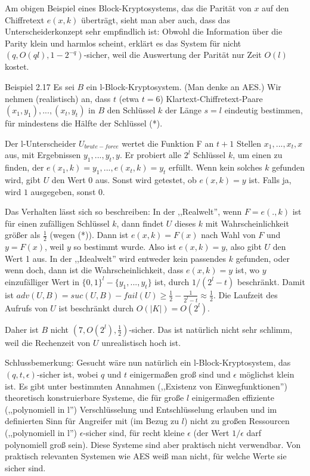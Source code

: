 \documentclass[a4paper]{article}
\begin{document}
\begin{multicols}{3}
    Am obigen Beispiel eines Block-Kryptosystems, das die Parität von $x$ auf den Chiffretext $e(x,k)$ überträgt, sieht man aber auch, dass das Unterscheiderkonzept sehr empfindlich ist: Obwohl die Information über die Parity klein und harmlos scheint, erklärt es das System für nicht $(q,O(ql), 1-2^{-q})$-sicher, weil die Auswertung der Parität nur Zeit $O(l)$ kostet.

    Beispiel 2.17 Es sei $B$ ein l-Block-Kryptosystem. (Man denke an AES.) Wir nehmen (realistisch) an, dass $t$ (etwa $t=6$) Klartext-Chiffretext-Paare $(x_1,y_1),...,(x_t,y_t)$ in $B$ den Schlüssel $k$ der Länge $s=l$ eindeutig bestimmen, für mindestens die Hälfte der Schlüssel (*).

    Der l-Unterscheider $U_{brute-force}$ wertet die Funktion F an $t+1$ Stellen $x_1,...,x_t,x$ aus, mit Ergebnissen $y_1,...,y_t,y$. Er probiert alle $2^l$ Schlüssel $k$, um einen zu finden, der $e(x_1,k)=y_1 ,...,e(x_t,k) =y_t$ erfüllt. Wenn kein solches $k$ gefunden wird, gibt $U$ den Wert $0$ aus.
    Sonst wird getestet, ob $e(x,k)=y$ ist. Falls ja, wird $1$ ausgegeben, sonst $0$.

    Das Verhalten lässt sich so beschreiben: In der ,,Realwelt'', wenn $F=e(.,k)$ ist für einen zufälligen Schlüssel $k$, dann findet $U$  dieses $k$ mit Wahrscheinlichkeit größer als $\frac{1}{2}$ (wegen (*)). Dann ist $e(x,k) =F(x)$ nach Wahl von $F$ und $y=F(x)$, weil $y$ so bestimmt wurde.
    Also ist $e(x,k) =y$, also gibt $U$ den Wert 1 aus. In der ,,Idealwelt'' wird entweder kein passendes $k$ gefunden, oder wenn doch, dann ist die Wahrscheinlichkeit, dass $e(x,k) =y$ ist, wo $y$ einzufälliger Wert in $\{0,1\}^l-\{y_1,...,y_t\}$ ist, durch $1/(2^l-t)$ beschränkt. Damit ist $adv(U,B) = suc(U,B)-fail(U)\geq \frac{1}{2}-\frac{1}{2^l-t}\approx\frac{1}{2}$.
    Die Laufzeit des Aufrufs von $U$ ist beschränkt durch $O(|K|) =O(2^l)$.

    Daher ist $B$ nicht $(7, O(2^l),\frac{1}{2})$-sicher. Das ist natürlich nicht sehr schlimm, weil die Rechenzeit von $U$ unrealistisch hoch ist.

    Schlussbemerkung: Gesucht wäre nun natürlich ein l-Block-Kryptosystem, das $(q,t,\epsilon)$-sicher ist, wobei $q$ und $t$ einigermaßen groß sind und $\epsilon$ möglichst klein ist. Es gibt unter bestimmten Annahmen (,,Existenz von Einwegfunktionen'') theoretisch konstruierbare Systeme, die für große $l$ einigermaßen effiziente (,,polynomiell in l'') Verschlüsselung und Entschlüsselung erlauben und im definierten Sinn für Angreifer mit (im Bezug zu $l$) nicht zu großen Ressourcen (,,polynomiell in l'') $\epsilon$-sicher sind, für recht kleine $\epsilon$ (der Wert $1/\epsilon$ darf polynomiell groß sein). Diese Systeme sind aber praktisch nicht verwendbar. Von praktisch relevanten Systemen wie AES weiß man nicht, für welche Werte sie sicher sind.


\end{multicols}
\end{document}
